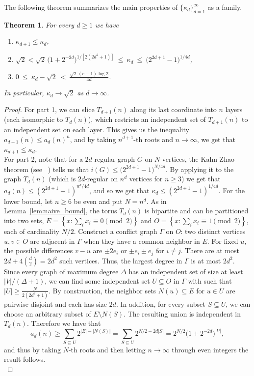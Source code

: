 \documentclass{article}
\theoremstyle{plain}
\newtheorem{theorem}{Theorem}[section]
\theoremstyle{definition}
\theoremstyle{remark}
\begin{document}
The following theorem summarizes the main properties of $\{\kappa_d\}_{d=1}^\infty$ as a family.

\begin{theorem}\label{thm:decreasing}
For every $d \geq 1$ we have
\begin{enumerate}
    \item $\kappa_{d+1} \leq \kappa_d$,
    \item $\sqrt2 < \sqrt2\,
\bigl(1+2^{-2d}\bigr)^{1/[2(2d^2+1)]} \ \le\ \kappa_d\ \le\ \big(2^{2d+1}-1\big)^{1/4d}$,
    \item  $0\ \le\ \kappa_d-\sqrt2\ <\ \frac{\sqrt2\,(e-1)\log2}{4d}$.
\end{enumerate}
In particular, $\kappa_d \to \sqrt{2}$  as $d\to \infty$.  
\end{theorem}
\begin{proof}
For part 1, we can slice $T_{d+1}(n)$ along its last coordinate into $n$ layers (each isomorphic to $T_d(n)$), which restricts an independent set of $T_{d+1}(n)$ to an independent set on each layer. This gives us the inequality $a_{d+1}(n)\le a_d(n)^n$, and by taking $n^{d+1}$-th roots and $n\to\infty$, we get that $\kappa_{d+1}\le\kappa_d$.\\

For part 2, note that for a $2d$-regular graph $G$ on $N$ vertices, the Kahn-Zhao theorem (see ~\cite{Kahn2001,Zhao2010}) tells us that $i(G)\le\big(2^{2d+1}-1\big)^{N/4d}$. By applying it to the graph $T_d(n)$ (which is $2d$-regular on $n^d$ vertices for $n\ge3$) we get that $a_d(n)\le(2^{2d+1}-1)^{n^d/4d}$, and so we get that $\kappa_d\le(2^{2d+1}-1)^{1/4d}$. For the lower bound, let $n\ge6$ be even and put $N=n^d$. As in Lemma~\ref{lem:naive_bound}, the torus $T_d(n)$ is bipartite and can be partitioned into two sets,  $E=\left\{x:\sum_i x_i\equiv0\pmod2\right\}$ and $O=\left\{x:\sum_i x_i\equiv1\pmod2\right\}$,  each of cardinality $N/2$. Construct a conflict graph $\Gamma$ on $O$: two distinct vertices $u,v\in O$ are adjacent in $\Gamma$ when they have a common neighbor in $E$. For fixed $u$, the possible differences $v-u$ are $\pm2e_i$ or $\pm e_i\pm e_j$ for $i\ne j$. There are at most $2d+4\binom d2=2d^2$ such vertices. Thus, the largest degree in $\Gamma$ is at most $2d^2$.\\

Since every graph of maximum degree $\Delta$ has an independent set of size at least $|V|/(\Delta+1)$, we can find some independent set $U\subseteq O$ in $\Gamma$ with such that $|U|\ge\frac{N}{2(2d^2+1)}$. By construction, the neighbor sets $N(u)\subseteq E$ for $u\in U$ are pairwise disjoint and each has size $2d$. In addition, for every subset $S\subseteq U$, we can choose an arbitrary subset of $E\setminus N(S)$. The resulting union is independent in $T_d(n)$. Therefore we have that 
\[
a_d(n) \ge
\sum_{S\subseteq U}2^{|E|-|N(S)|} =
\sum_{S\subseteq U}2^{N/2-2d|S|} =
2^{N/2}\bigl(1+2^{-2d}\bigr)^{|U|},
\]
and thus by taking $N$-th roots and then letting $n\to\infty$ through even integers the result follows.\\


\end{proof}
\end{document}
